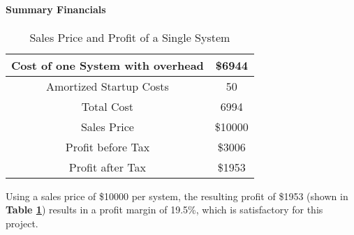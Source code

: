 \documentclass[PPFS.tex]{template/subfiles}
\begin{document}
        \paragraph{Summary Financials}
        
		\begin{table}[H]
			\begin{center}
				\caption{Sales Price and Profit of a Single System}
				\label{tab:SalesPrice}
				\begin{tabular}{|c|c|}
					\hline
					Cost of one System with overhead & \$6944\\
					\hline
					Amortized Startup Costs & 50\\
					\hline
					Total Cost & 6994\\
					\hline
					Sales Price & \$10000\\
					\hline
					Profit before Tax& \$3006\\
					\hline
					Profit after Tax& \$1953\\
					\hline
				\end{tabular}
			\end{center}
		\end{table}
        
        Using a sales price of \$10000 per system, the resulting profit of \$1953 (shown in \textbf{Table \ref{tab:SalesPrice}}) results in a profit margin of 19.5\%, which is satisfactory for this project.
        
        
\end{document}
